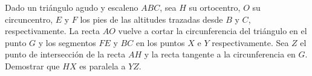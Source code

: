 Dado un triángulo agudo y escaleno $ ABC$, sea $ H$ su ortocentro, $ O$ su circuncentro, $ E$ y $ F$ los pies de las altitudes trazadas desde $ B$ y $ C$, respectivamente. La recta $ AO$ vuelve a cortar la circunferencia del triángulo en el punto $ G$ y los segmentos $ FE$ y $ BC$ en los puntos $ X$ e $ Y$ respectivamente. Sea $ Z$ el punto de intersección de la recta $ AH$ y la recta tangente a la circunferencia en $ G$. Demostrar que $ HX$ es paralela a $ YZ$.
